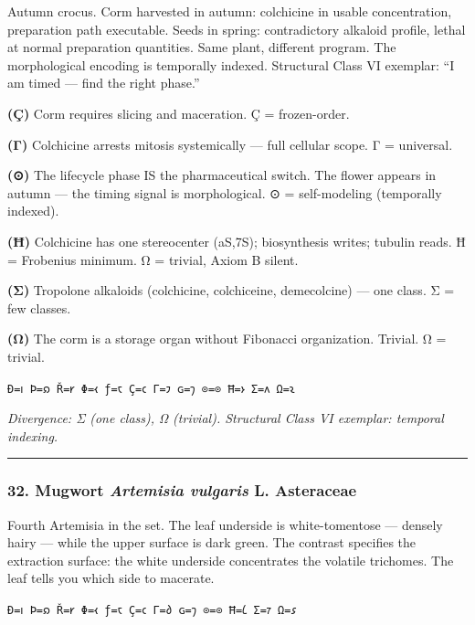 \documentclass[12pt,a4paper]{article}
\begin{document}
Autumn crocus. Corm harvested in autumn: colchicine in usable
concentration, preparation path executable. Seeds in spring:
contradictory alkaloid profile, lethal at normal preparation quantities.
Same plant, different program. The morphological encoding is temporally
indexed. Structural Class VI exemplar: ``I am timed --- find the right
phase.''

\textbf{(Ç)} Corm requires slicing and maceration. Ç = frozen-order.

\textbf{(Γ)} Colchicine arrests mitosis systemically --- full cellular
scope. Γ = universal.

\textbf{(⊙)} The lifecycle phase IS the pharmaceutical switch. The
flower appears in autumn --- the timing signal is morphological. ⊙ =
self-modeling (temporally indexed).

\textbf{(Ħ)} Colchicine has one stereocenter (aS,7S); biosynthesis
writes; tubulin reads. Ħ = Frobenius minimum. Ω = trivial, Axiom B
silent.

\textbf{(Σ)} Tropolone alkaloids (colchicine, colchiceine, demecolcine)
--- one class. Σ = few classes.

\textbf{(Ω)} The corm is a storage organ without Fibonacci organization.
Trivial. Ω = trivial.

\texttt{Ð=𐑦\ Þ=𐑸\ Ř=𐑾\ Φ=𐑬\ ƒ=𐑱\ Ç=𐑤\ Γ=𐑲\ ɢ=𐑠\ ⊙=⊙\ Ħ=𐑶\ Σ=𐑵\ Ω=𐑷}

\emph{Divergence: Σ (one class), Ω (trivial). Structural Class VI
exemplar: temporal indexing.}

\begin{center}\rule{0.5\linewidth}{0.5pt}\end{center}

\hypertarget{mugwort-artemisia-vulgaris-l.-asteraceae}{%
\subsubsection{\texorpdfstring{32. Mugwort \textbar{} \emph{Artemisia
vulgaris} L. \textbar{}
Asteraceae}{32. Mugwort \textbar{} Artemisia vulgaris L. \textbar{} Asteraceae}}\label{mugwort-artemisia-vulgaris-l.-asteraceae}}

Fourth Artemisia in the set. The leaf underside is white-tomentose ---
densely hairy --- while the upper surface is dark green. The contrast
specifies the extraction surface: the white underside concentrates the
volatile trichomes. The leaf tells you which side to macerate.

\texttt{Ð=𐑦\ Þ=𐑸\ Ř=𐑾\ Φ=𐑬\ ƒ=𐑱\ Ç=𐑤\ Γ=𐑔\ ɢ=𐑠\ ⊙=⊙\ Ħ=𐑖\ Σ=𐑳\ Ω=𐑭}
\end{document}
